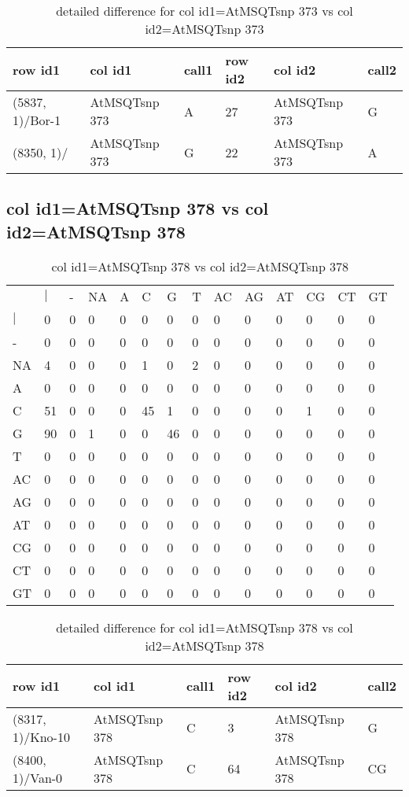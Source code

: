 \begin{center}
\begin{longtable}{|l|l|l|l|l|l|}
\caption{detailed difference for col id1=AtMSQTsnp 373 vs col id2=AtMSQTsnp 373} \label{table_dm691}\\
\hline
row id1&col id1&call1&row id2&col id2&call2\\
\hline
(5837, 1)/Bor-1&AtMSQTsnp 373&A&27&AtMSQTsnp 373&G\\
(8350, 1)/&AtMSQTsnp 373&G&22&AtMSQTsnp 373&A\\
\hline
\end{longtable}
\end{center}

\subsection{col id1=AtMSQTsnp 378 vs col id2=AtMSQTsnp 378}
\begin{center}
\begin{longtable}{|l|l|l|l|l|l|l|l|l|l|l|l|l|l|}
\caption{col id1=AtMSQTsnp 378 vs col id2=AtMSQTsnp 378} \label{table_dm692}\\
\hline
\\
\hline
&$|$&-&NA&A&C&G&T&AC&AG&AT&CG&CT&GT\\
$|$&0&0&0&0&0&0&0&0&0&0&0&0&0\\
-&0&0&0&0&0&0&0&0&0&0&0&0&0\\
NA&4&0&0&0&1&0&2&0&0&0&0&0&0\\
A&0&0&0&0&0&0&0&0&0&0&0&0&0\\
C&51&0&0&0&45&1&0&0&0&0&1&0&0\\
G&90&0&1&0&0&46&0&0&0&0&0&0&0\\
T&0&0&0&0&0&0&0&0&0&0&0&0&0\\
AC&0&0&0&0&0&0&0&0&0&0&0&0&0\\
AG&0&0&0&0&0&0&0&0&0&0&0&0&0\\
AT&0&0&0&0&0&0&0&0&0&0&0&0&0\\
CG&0&0&0&0&0&0&0&0&0&0&0&0&0\\
CT&0&0&0&0&0&0&0&0&0&0&0&0&0\\
GT&0&0&0&0&0&0&0&0&0&0&0&0&0\\
\hline
\end{longtable}
\end{center}

\begin{center}
\begin{longtable}{|l|l|l|l|l|l|}
\caption{detailed difference for col id1=AtMSQTsnp 378 vs col id2=AtMSQTsnp 378} \label{table_dm693}\\
\hline
row id1&col id1&call1&row id2&col id2&call2\\
\hline
(8317, 1)/Kno-10&AtMSQTsnp 378&C&3&AtMSQTsnp 378&G\\
(8400, 1)/Van-0&AtMSQTsnp 378&C&64&AtMSQTsnp 378&CG\\
\hline
\end{longtable}
\end{center}

